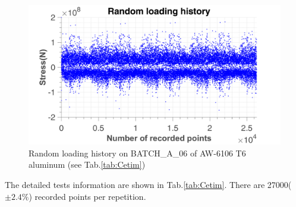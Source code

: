 \documentclass[3p,times,procedia,number]{elsarticle}
\begin{document}
\begin{figure}[!h]
	\centering
	\includegraphics[width=\textwidth]{figures//EP_a_06_random.png} 
	\caption{Random loading history on BATCH\_A\_06 of AW-6106 T6 aluminum (see Tab.\ref{tab:Cetim})}
\end{figure}	
The detailed tests information are shown in Tab.\ref{tab:Cetim}. There are 27000($\pm 2.4\%$) recorded points per repetition. 
\end{document}
